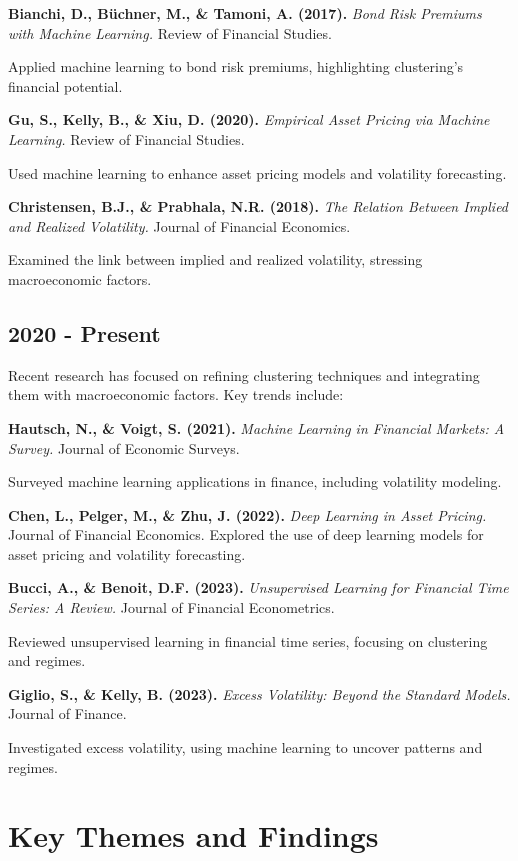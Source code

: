 \textbf{Bianchi, D., Büchner, M., \& Tamoni, A. (2017).} \textit{Bond Risk Premiums with Machine Learning.} Review of Financial Studies.

Applied machine learning to bond risk premiums, highlighting clustering's financial potential.

\textbf{Gu, S., Kelly, B., \& Xiu, D. (2020).} \textit{Empirical Asset Pricing via Machine Learning.} Review of Financial Studies.

Used machine learning to enhance asset pricing models and volatility forecasting.

\textbf{Christensen, B.J., \& Prabhala, N.R. (2018).} \textit{The Relation Between Implied and Realized Volatility.} Journal of Financial Economics.

Examined the link between implied and realized volatility, stressing macroeconomic factors.

\subsection{2020 - Present}

Recent research has focused on refining clustering techniques and integrating them with macroeconomic factors. Key trends include:

\textbf{Hautsch, N., \& Voigt, S. (2021).} \textit{Machine Learning in Financial Markets: A Survey. }Journal of Economic Surveys.

Surveyed machine learning applications in finance, including volatility modeling.

\textbf{Chen, L., Pelger, M., \& Zhu, J. (2022).} \textit{Deep Learning in Asset Pricing.} Journal of Financial Economics.
Explored the use of deep learning models for asset pricing and volatility forecasting.

\textbf{Bucci, A., \& Benoit, D.F. (2023).} \textit{Unsupervised Learning for Financial Time Series: A Review.} Journal of Financial Econometrics.

Reviewed unsupervised learning in financial time series, focusing on clustering and regimes.

\textbf{Giglio, S., \& Kelly, B. (2023).} \textit{Excess Volatility: Beyond the Standard Models.} Journal of Finance.

Investigated excess volatility, using machine learning to uncover patterns and regimes.

\section{Key Themes and Findings}

